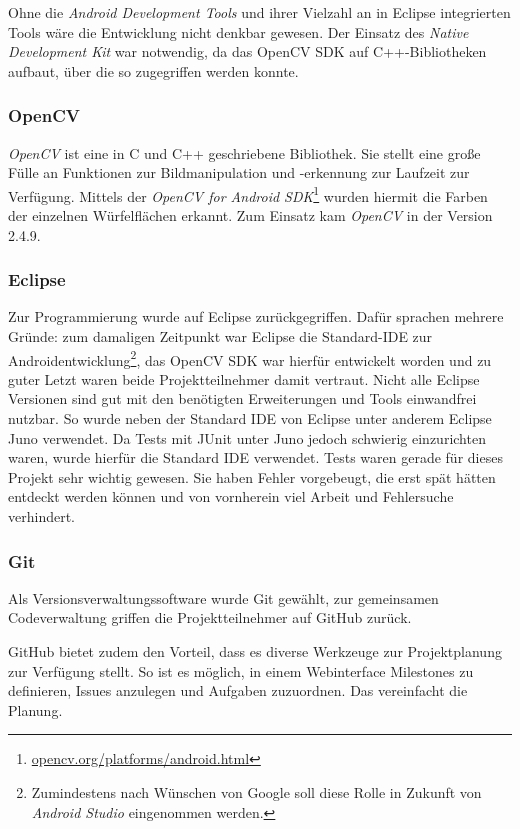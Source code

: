 Ohne die \emph{Android Development Tools} und ihrer Vielzahl an in Eclipse
integrierten Tools wäre die Entwicklung nicht denkbar gewesen. Der Einsatz des
\emph{Native Development Kit} war notwendig, da das OpenCV SDK auf
C++-Bibliotheken aufbaut, über die so zugegriffen werden konnte.

\subsubsection{OpenCV}  %

\emph{OpenCV} ist eine in C und C++ geschriebene Bibliothek. Sie stellt eine große
Fülle an Funktionen zur Bildmanipulation und -erkennung zur Laufzeit zur
Verfügung. Mittels der \emph{OpenCV for Android
SDK}\footnote{\url{opencv.org/platforms/android.html}} wurden hiermit die Farben
der einzelnen Würfelflächen erkannt. Zum Einsatz kam \emph{OpenCV} in der Version 2.4.9.

\subsubsection{Eclipse}  %

Zur Programmierung wurde auf Eclipse zurückgegriffen. Dafür sprachen mehrere
Gründe: zum damaligen Zeitpunkt war Eclipse die Standard-IDE zur
Androidentwicklung\footnote{Zumindestens nach Wünschen von Google soll diese
Rolle in Zukunft von \emph{Android Studio} eingenommen werden.}, das OpenCV SDK
war hierfür entwickelt worden und zu guter Letzt waren beide Projektteilnehmer damit vertraut.
Nicht alle Eclipse Versionen sind gut mit den benötigten Erweiterungen und Tools
einwandfrei nutzbar. So wurde neben der Standard IDE von Eclipse unter anderem
Eclipse Juno verwendet. Da Tests mit JUnit unter Juno jedoch schwierig einzurichten
waren, wurde hierfür die Standard IDE verwendet. Tests waren gerade für dieses Projekt
sehr wichtig gewesen. Sie haben Fehler vorgebeugt, die erst spät hätten entdeckt werden
können und von vornherein viel Arbeit und Fehlersuche verhindert.

\subsubsection{Git}  %

Als Versionsverwaltungssoftware wurde Git gewählt, zur gemeinsamen
Codeverwaltung griffen die Projektteilnehmer auf GitHub zurück.

GitHub bietet zudem den Vorteil, dass es diverse Werkzeuge zur Projektplanung zur
Verfügung stellt. So ist es möglich, in einem Webinterface Milestones zu
definieren, Issues anzulegen und Aufgaben zuzuordnen. Das vereinfacht die
Planung.

